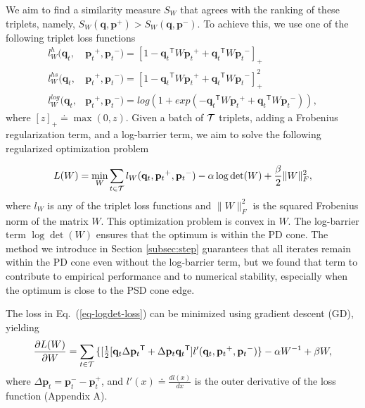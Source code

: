 \documentclass[twoside,11pt]{article}
\newcommand\mat[1]{{#1}}
\renewcommand\vec[1]{\mathbf{#1}}
\newcommand{\T}{{}^\mathsf{T}}
\newcommand{\W}{\mat{W}}
\newcommand{\eqdef}{\doteq}
\newcommand{\frobsq}[1]{{\|#1\|_F^2}}
\newcommand{\q}{{\vec{q}}}
\newcommand{\p}{{\vec{p}}}
\newcommand{\trip}{{t}}
\newcommand{\qt}{{\q_{\trip}}}
\newcommand{\pt}{{\p_{\trip}}}
\newcommand{\triplet}{(\qt, \pt^{+}, \pt^{-})}
\renewcommand{\eqref}[1]{Eq.~(\ref{#1})}
\begin{document}
We aim to find a similarity measure $S_{\W}$ that agrees with the ranking of these triplets, namely, $S_{\W}(\q, \p^{+}) > S_{\W}(\q,
\p^{-})$. To achieve this, we use one of the following triplet loss functions
\begin{align}
\label{single-triplet-lossed}
l_{\W}^h(\qt, &\pt^{+}, \pt^{-}) = [1-\qt\T\W\pt^+ + \qt\T\W\pt^-]_{+}
 \\ \nonumber
l_{\W}^{hs}(\qt, &\pt^+, \pt^-) = [1-\qt\T\W\pt^+ + \qt\T\W\pt^-]_{+}^2
 \\ \nonumber
l_{\W}^{log}(\qt, &\pt^+, \pt^-) = log(1+exp(-\qt\T\W\pt^+ + \qt\T\W\pt^-)) \nonumber ,
\end{align}
where $[z]_{+} \eqdef \max(0,z)$. Given a batch of $\cal{T}$ triplets, adding a Frobenius regularization term, and a log-barrier term, we aim to solve the following regularized optimization problem

\begin{equation}
\label{eq-logdet-loss}
L(W) = 
  \min_{\W} \sum_{\trip \in \cal{T}}  l_{\W}(\qt, \pt^+, \pt^-) - \alpha \log \det(\W) + \frac{\beta}{2} \frobsq{\W},
\end{equation}
where $l_{\W}$ is any of the triplet loss functions and $\frobsq{\W}$ is the squared Frobenius norm of the matrix $\W$. This optimization problem is convex in $\W$.
The log-barrier term $\log \det(\W)$ ensures that the optimum is within the PD cone. The method we introduce in Section \ref{subsec:step} guarantees that all iterates remain within the PD cone even without the log-barrier term, but we found that term to contribute to empirical performance and to numerical stability, especially when the optimum is close to the PSD cone edge.


The loss in \eqref{eq-logdet-loss} can be minimized using gradient descent (GD), yielding
\begin{equation}
  \frac{\partial {L (\W)}}{\partial \W} = \sum\limits_{t\in \cal{T}}{\{
  [\tfrac{1}{2}[\q_{t}\Delta\p_{t}\T + \Delta\p_{t}\q_{t}\T]  }
  {l'}\triplet\} - \alpha \W^{-1} + \beta \W,
  \label{gradMtx}
\end{equation}
where $\Delta\p_t = \p_t^- - \p_t^+$, and $l'(x) \eqdef \frac{d{l(x)}}{dx}$ is the outer derivative of the loss function (Appendix A).%
\vspace{-6pt}
\end{document}
